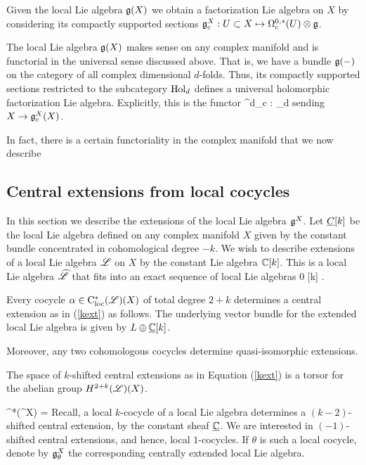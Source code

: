 Given the local Lie algebra $\mathfrak g(X)$ we obtain a factorization Lie algebra on $X$ by considering its compactly supported sections $\mathfrak g_c^X : U \subset X \mapsto \Omega^{0,*}_c(U) \otimes \mathfrak g$. 

The local Lie algebra $\mathfrak g(X)$ makes sense on any complex manifold and is functorial in the universal sense discussed above. That is, we have a bundle $\mathfrak g(-)$ on the category of all complex dimensional $d$-folds. Thus, its compactly supported sections restricted to the subcategory ${\rm Hol}_d$ defines a universal holomorphic factorization Lie algebra. Explicitly, this is the functor
\ben
\fg^d_c : \Hol_d \to \Lcat
\een
sending $X \to \mathfrak g^X_c(X)$. 

In fact, there is a certain functoriality in the complex manifold that we now describe 

\subsection{Central extensions from local cocycles}

In this section we describe the extensions of the local Lie algebra $\mathfrak g^X$. Let $\underline{C}[k]$ be the local Lie algebra defined on any complex manifold $X$ given by the constant bundle concentrated in cohomological degree $-k$. We wish to describe extensions of a local Lie algebra $\mathscr L$ on $X$ by the constant Lie algebra $\mathbb C[k]$. This is a local Lie algebra $\widehat{\mathscr L}$ that fits into an exact sequence of local Lie algebras
\be\label{kext}
0 \to \ul{\CC}[k] \to \Hat{\sL} \to \sL {} .
\ee

Every cocycle $\alpha \in {\rm C}_{\rm loc}^*(\mathscr L)(X)$ of total degree $2+k$ determines a central extension as in (\ref{kext}) as follows. The underlying vector bundle for the extended local Lie algebra is given by $L \oplus \underline{\mathbb C
}[k]$. 

Moreover, any two cohomologous cocycles determine quasi-isomorphic extensions. 

\begin{lem} The space of $k$-shifted central extensions as in Equation (\ref{kext}) is a torsor for the abelian group $H^{2+k}(\mathscr L)(X)$. 
\end{lem}


\ben
\cloc^*(\fg^X) = 
\een
Recall, a local $k$-cocycle of a local Lie algebra determines a $(k-2)$-shifted central extension, by the constant sheaf $\underline{\mathbb C}$. We are interested in $(-1)$-shifted central extensions, and hence, local $1$-cocycles. 
If $\theta$ is such a local cocycle, denote by $\mathfrak g^X_\theta$ the corresponding centrally extended local Lie algebra. 

